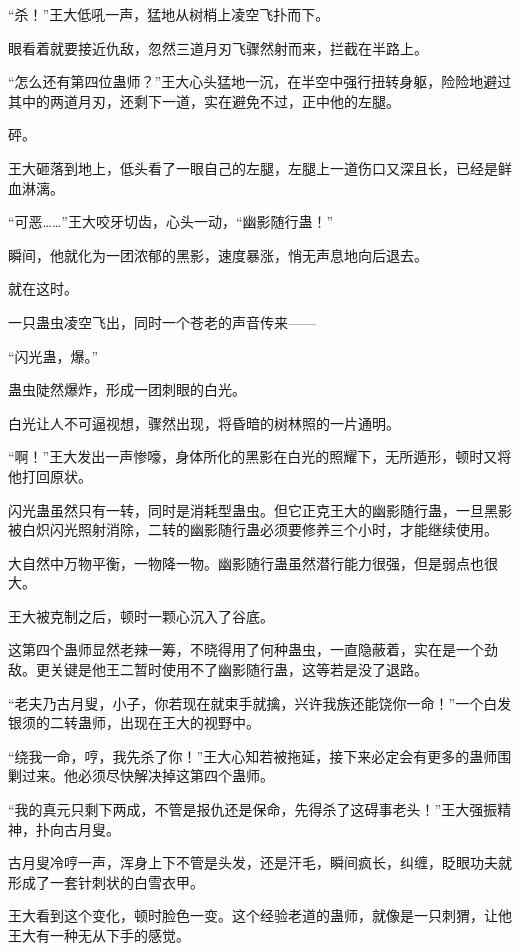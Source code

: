 
\begin{this_body}

“杀！”王大低吼一声，猛地从树梢上凌空飞扑而下。

眼看着就要接近仇敌，忽然三道月刃飞骤然射而来，拦截在半路上。

“怎么还有第四位蛊师？”王大心头猛地一沉，在半空中强行扭转身躯，险险地避过其中的两道月刃，还剩下一道，实在避免不过，正中他的左腿。

砰。

王大砸落到地上，低头看了一眼自己的左腿，左腿上一道伤口又深且长，已经是鲜血淋漓。

“可恶……”王大咬牙切齿，心头一动，“幽影随行蛊！”

瞬间，他就化为一团浓郁的黑影，速度暴涨，悄无声息地向后退去。

就在这时。

一只蛊虫凌空飞出，同时一个苍老的声音传来——

“闪光蛊，爆。”

蛊虫陡然爆炸，形成一团刺眼的白光。

白光让人不可逼视想，骤然出现，将昏暗的树林照的一片通明。

“啊！”王大发出一声惨嚎，身体所化的黑影在白光的照耀下，无所遁形，顿时又将他打回原状。

闪光蛊虽然只有一转，同时是消耗型蛊虫。但它正克王大的幽影随行蛊，一旦黑影被白炽闪光照射消除，二转的幽影随行蛊必须要修养三个小时，才能继续使用。

大自然中万物平衡，一物降一物。幽影随行蛊虽然潜行能力很强，但是弱点也很大。

王大被克制之后，顿时一颗心沉入了谷底。

这第四个蛊师显然老辣一筹，不晓得用了何种蛊虫，一直隐蔽着，实在是一个劲敌。更关键是他王二暂时使用不了幽影随行蛊，这等若是没了退路。

“老夫乃古月叟，小子，你若现在就束手就擒，兴许我族还能饶你一命！”一个白发银须的二转蛊师，出现在王大的视野中。

“绕我一命，哼，我先杀了你！”王大心知若被拖延，接下来必定会有更多的蛊师围剿过来。他必须尽快解决掉这第四个蛊师。

“我的真元只剩下两成，不管是报仇还是保命，先得杀了这碍事老头！”王大强振精神，扑向古月叟。

古月叟冷哼一声，浑身上下不管是头发，还是汗毛，瞬间疯长，纠缠，眨眼功夫就形成了一套针刺状的白雪衣甲。

王大看到这个变化，顿时脸色一变。这个经验老道的蛊师，就像是一只刺猬，让他王大有一种无从下手的感觉。


\end{this_body}

